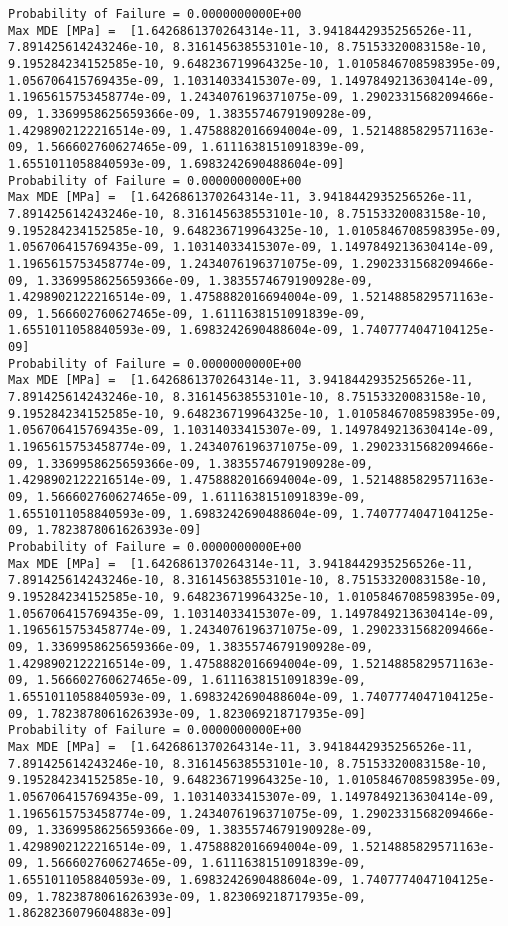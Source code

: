 \documentclass[11pt]{article}
\begin{document}
\begin{Verbatim}[commandchars=\\\{\}]
Probability of Failure = 0.0000000000E+00
Max MDE [MPa] =  [1.6426861370264314e-11, 3.9418442935256526e-11, 7.891425614243246e-10, 8.316145638553101e-10, 8.75153320083158e-10, 9.195284234152585e-10, 9.648236719964325e-10, 1.0105846708598395e-09, 1.056706415769435e-09, 1.10314033415307e-09, 1.1497849213630414e-09, 1.1965615753458774e-09, 1.2434076196371075e-09, 1.2902331568209466e-09, 1.3369958625659366e-09, 1.3835574679190928e-09, 1.4298902122216514e-09, 1.4758882016694004e-09, 1.5214885829571163e-09, 1.566602760627465e-09, 1.6111638151091839e-09, 1.6551011058840593e-09, 1.6983242690488604e-09]
Probability of Failure = 0.0000000000E+00
Max MDE [MPa] =  [1.6426861370264314e-11, 3.9418442935256526e-11, 7.891425614243246e-10, 8.316145638553101e-10, 8.75153320083158e-10, 9.195284234152585e-10, 9.648236719964325e-10, 1.0105846708598395e-09, 1.056706415769435e-09, 1.10314033415307e-09, 1.1497849213630414e-09, 1.1965615753458774e-09, 1.2434076196371075e-09, 1.2902331568209466e-09, 1.3369958625659366e-09, 1.3835574679190928e-09, 1.4298902122216514e-09, 1.4758882016694004e-09, 1.5214885829571163e-09, 1.566602760627465e-09, 1.6111638151091839e-09, 1.6551011058840593e-09, 1.6983242690488604e-09, 1.7407774047104125e-09]
Probability of Failure = 0.0000000000E+00
Max MDE [MPa] =  [1.6426861370264314e-11, 3.9418442935256526e-11, 7.891425614243246e-10, 8.316145638553101e-10, 8.75153320083158e-10, 9.195284234152585e-10, 9.648236719964325e-10, 1.0105846708598395e-09, 1.056706415769435e-09, 1.10314033415307e-09, 1.1497849213630414e-09, 1.1965615753458774e-09, 1.2434076196371075e-09, 1.2902331568209466e-09, 1.3369958625659366e-09, 1.3835574679190928e-09, 1.4298902122216514e-09, 1.4758882016694004e-09, 1.5214885829571163e-09, 1.566602760627465e-09, 1.6111638151091839e-09, 1.6551011058840593e-09, 1.6983242690488604e-09, 1.7407774047104125e-09, 1.7823878061626393e-09]
Probability of Failure = 0.0000000000E+00
Max MDE [MPa] =  [1.6426861370264314e-11, 3.9418442935256526e-11, 7.891425614243246e-10, 8.316145638553101e-10, 8.75153320083158e-10, 9.195284234152585e-10, 9.648236719964325e-10, 1.0105846708598395e-09, 1.056706415769435e-09, 1.10314033415307e-09, 1.1497849213630414e-09, 1.1965615753458774e-09, 1.2434076196371075e-09, 1.2902331568209466e-09, 1.3369958625659366e-09, 1.3835574679190928e-09, 1.4298902122216514e-09, 1.4758882016694004e-09, 1.5214885829571163e-09, 1.566602760627465e-09, 1.6111638151091839e-09, 1.6551011058840593e-09, 1.6983242690488604e-09, 1.7407774047104125e-09, 1.7823878061626393e-09, 1.823069218717935e-09]
Probability of Failure = 0.0000000000E+00
Max MDE [MPa] =  [1.6426861370264314e-11, 3.9418442935256526e-11, 7.891425614243246e-10, 8.316145638553101e-10, 8.75153320083158e-10, 9.195284234152585e-10, 9.648236719964325e-10, 1.0105846708598395e-09, 1.056706415769435e-09, 1.10314033415307e-09, 1.1497849213630414e-09, 1.1965615753458774e-09, 1.2434076196371075e-09, 1.2902331568209466e-09, 1.3369958625659366e-09, 1.3835574679190928e-09, 1.4298902122216514e-09, 1.4758882016694004e-09, 1.5214885829571163e-09, 1.566602760627465e-09, 1.6111638151091839e-09, 1.6551011058840593e-09, 1.6983242690488604e-09, 1.7407774047104125e-09, 1.7823878061626393e-09, 1.823069218717935e-09, 1.8628236079604883e-09]

\end{Verbatim}
\end{document}
